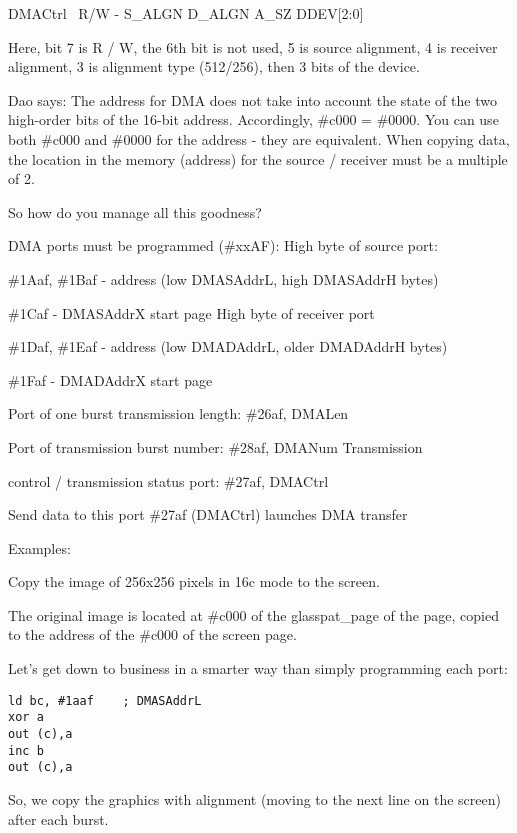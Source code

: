 DMACtrl ~R/W - S\_ALGN D\_ALGN A\_SZ DDEV[2:0]

Here, bit 7 is R / W, the 6th bit is not used, 5 is source alignment,
4 is receiver alignment, 3 is alignment type (512/256), then 3 bits of
the device.

Dao says: The address for DMA does not take into account the state of
the two high-order bits of the 16-bit address.  Accordingly, \#c000 =
\#0000. You can use both \#c000 and \#0000 for the address - they are
equivalent.  When copying data, the location in the memory (address)
for the source / receiver must be a multiple of 2.

So how do you manage all this goodness?

DMA ports must be programmed (\#xxAF): High byte of source port:

\#1Aaf, \#1Baf - address (low DMASAddrL, high DMASAddrH bytes)

\#1Caf - DMASAddrX start page High byte of receiver port

\#1Daf, \#1Eaf - address (low DMADAddrL, older DMADAddrH bytes)

\#1Faf - DMADAddrX start page

Port of one burst transmission length: \#26af, DMALen

Port of transmission burst number: \#28af, DMANum Transmission

control / transmission status port: \#27af, DMACtrl

Send data to this port \#27af (DMACtrl) launches DMA transfer

Examples:

Copy the image of 256x256 pixels in 16c mode to the screen.

The original image is located at \#c000 of the glasspat\_page of the
page, copied to the address of the \#c000 of the screen page.

Let's get down to business in a smarter way than simply programming
each port:
\begin{verbatim}
ld bc, #1aaf    ; DMASAddrL
xor a
out (c),a
inc b
out (c),a
\end{verbatim}
So, we copy the graphics with alignment (moving to the next line on
the screen) after each burst.

